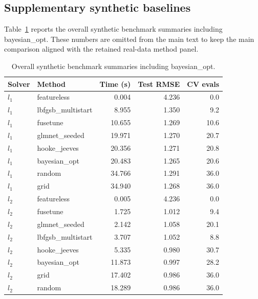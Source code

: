 \documentclass[pdflatex,iicol,sn-mathphys-num]{sn-jnl}
\newcommand{\codeid}{\texttt{fusetune}}
\def\texttt#1{#1}%
\def\codeid{fusetune}%
\def\ell{l}%
\begin{document}
\clearpage
\begin{appendices}

\section{Supplementary synthetic baselines}
Table~\ref{tab:appendix_synth_overall} reports the overall synthetic benchmark summaries including \texttt{bayesian\_opt}. These numbers are omitted from the main text to keep the main comparison aligned with the retained real-data method panel.

\begin{table}[ht]
\caption{Overall synthetic benchmark summaries including \texttt{bayesian\_opt}.}
\label{tab:appendix_synth_overall}
\centering
\footnotesize
\begin{tabular}{llrrr}
\toprule
Solver & Method & Time (s) & Test RMSE & CV evals \\
\midrule
\(\ell_1\) & \texttt{featureless} & 0.004 & 4.236 & 0.0 \\
\(\ell_1\) & \texttt{lbfgsb\_multistart} & 8.955 & 1.350 & 9.2 \\
\(\ell_1\) & \codeid & 10.655 & 1.269 & 10.6 \\
\(\ell_1\) & \texttt{glmnet\_seeded} & 19.971 & 1.270 & 20.7 \\
\(\ell_1\) & \texttt{hooke\_jeeves} & 20.356 & 1.271 & 20.8 \\
\(\ell_1\) & \texttt{bayesian\_opt} & 20.483 & 1.265 & 20.6 \\
\(\ell_1\) & \texttt{random} & 34.766 & 1.291 & 36.0 \\
\(\ell_1\) & \texttt{grid} & 34.940 & 1.268 & 36.0 \\
\midrule
\(\ell_2\) & \texttt{featureless} & 0.005 & 4.236 & 0.0 \\
\(\ell_2\) & \codeid & 1.725 & 1.012 & 9.4 \\
\(\ell_2\) & \texttt{glmnet\_seeded} & 2.142 & 1.058 & 20.1 \\
\(\ell_2\) & \texttt{lbfgsb\_multistart} & 3.707 & 1.052 & 8.8 \\
\(\ell_2\) & \texttt{hooke\_jeeves} & 5.335 & 0.980 & 30.7 \\
\(\ell_2\) & \texttt{bayesian\_opt} & 11.873 & 0.997 & 28.2 \\
\(\ell_2\) & \texttt{grid} & 17.402 & 0.986 & 36.0 \\
\(\ell_2\) & \texttt{random} & 18.289 & 0.986 & 36.0 \\
\bottomrule
\end{tabular}
\end{table}


\end{appendices}
\end{document}
